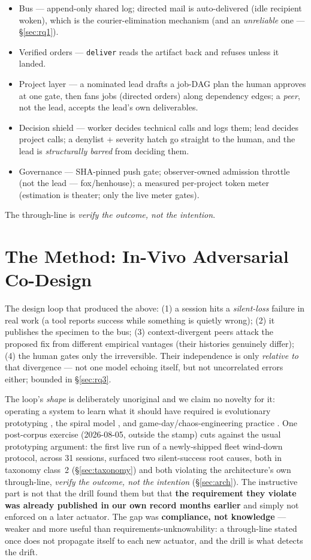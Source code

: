 \documentclass[10pt,conference]{IEEEtran}   %
\begin{document}
\begin{itemize}
\item Bus --- append-only shared log; directed mail is auto-delivered (idle
  recipient woken), which is the courier-elimination mechanism (and an
  \emph{unreliable} one --- \S\ref{sec:rq1}).
\item Verified orders --- \texttt{deliver} reads the artifact back and refuses unless
  it landed.
\item Project layer --- a nominated lead drafts a job-DAG plan the human approves at
  one gate, then fans jobs (directed orders) along dependency edges; a \emph{peer}, not the
  lead, accepts the lead's own deliverables.
\item Decision shield --- worker decides technical calls and logs them; lead decides
  project calls; a denylist + severity hatch go straight to the human, and the lead is
  \emph{structurally barred} from deciding them.
\item Governance --- SHA-pinned push gate; observer-owned admission throttle (not the
  lead --- fox/henhouse); a measured per-project token meter (estimation is theater;
  only the live meter gates).
\end{itemize}

The through-line is \emph{verify the outcome, not the intention}.

\section{The Method: In-Vivo Adversarial Co-Design}
\label{sec:method}
The design loop that produced the above: (1) a session hits a \emph{silent-loss} failure in
real work (a tool reports success while something is quietly wrong); (2) it publishes the
specimen to the bus; (3) context-divergent peers attack the proposed fix from different
empirical vantages (their histories genuinely differ); (4) the human gates only the irreversible.
Their independence is only \emph{relative to} that divergence --- not one model echoing itself,
but not uncorrelated errors either; bounded in \S\ref{sec:rq3}.

The loop's \emph{shape} is deliberately unoriginal and we claim no novelty for it: operating a
system to learn what it should have required is evolutionary prototyping
\cite{floyd1984,davis1992}, the spiral model \cite{boehm1988}, and game-day/chaos-engineering
practice \cite{basiri2016}. One post-corpus exercise (2026-08-05, outside the stamp) cuts against
the usual prototyping argument: the first live run of a newly-shipped fleet wind-down protocol,
across 31 sessions, surfaced two silent-success root causes, both in taxonomy class~2 (\S\ref{sec:taxonomy}) and
both violating the architecture's own through-line, \emph{verify the outcome, not the intention}
(\S\ref{sec:arch}). The instructive part is not that the drill found them but that \textbf{the requirement
they violate was already published in our own record months earlier} and simply not enforced on a
later actuator. The gap was \textbf{compliance, not knowledge} --- weaker and more useful than
requirements-unknowability: a through-line stated once does not propagate itself to each new
actuator, and the drill is what detects the drift.
\end{document}
